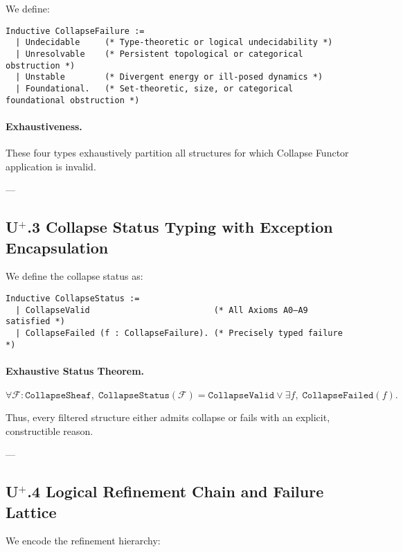 \documentclass[11pt]{article}
\begin{document}
We define:

\begin{lstlisting}[language=Coq]
Inductive CollapseFailure :=
  | Undecidable     (* Type-theoretic or logical undecidability *)
  | Unresolvable    (* Persistent topological or categorical obstruction *)
  | Unstable        (* Divergent energy or ill-posed dynamics *)
  | Foundational.   (* Set-theoretic, size, or categorical foundational obstruction *)
\end{lstlisting}

\paragraph{Exhaustiveness.} These four types exhaustively partition all structures for which Collapse Functor application is invalid.

---

\subsection*{U$^{+}$.3 Collapse Status Typing with Exception Encapsulation}

We define the collapse status as:

\begin{lstlisting}[language=Coq]
Inductive CollapseStatus :=
  | CollapseValid                         (* All Axioms A0–A9 satisfied *)
  | CollapseFailed (f : CollapseFailure). (* Precisely typed failure *)
\end{lstlisting}

\paragraph{Exhaustive Status Theorem.}

\[
\forall \mathcal{F} : \texttt{CollapseSheaf},\;
\texttt{CollapseStatus}(\mathcal{F}) = \texttt{CollapseValid} \lor \exists f,\; \texttt{CollapseFailed}(f).
\]

Thus, every filtered structure either admits collapse or fails with an explicit, constructible reason.

---

\subsection*{U$^{+}$.4 Logical Refinement Chain and Failure Lattice}

We encode the refinement hierarchy:
\end{document}
